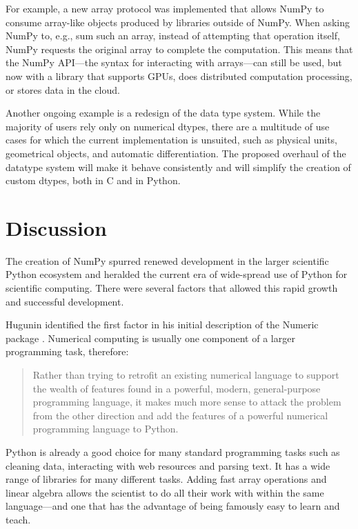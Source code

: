 For example, a new array protocol was implemented that allows NumPy to consume
array-like objects produced by libraries outside of NumPy.  When asking NumPy
to, e.g., sum such an array, instead of attempting that operation itself, NumPy
requests the original array to complete the computation.  This means that the
NumPy API---the syntax for interacting with arrays---can still be used, but now
with a library that supports GPUs, does distributed computation processing, or
stores data in the cloud.

Another ongoing example is a redesign of the data type system.
While the majority of users rely only on numerical dtypes, there are a
multitude of use cases for which the current implementation is unsuited, such
as physical units\cite{astropy,Goldbaum2018,pint}, geometrical
objects\cite{pygeos}, and automatic differentiation\cite{pyadolc}.
The proposed overhaul of the datatype system will make it behave consistently
and will simplify the creation of custom dtypes, both in C and in Python.


\section*{Discussion}



The creation of NumPy spurred renewed development in the larger scientific
Python ecosystem and heralded the current era of wide-spread use of Python for
scientific computing.
There were several factors that allowed this rapid growth
and successful development.

Hugunin identified the first factor in his initial description of the Numeric
package \cite{Hugunin-whitepaper}.  Numerical computing is usually one
component of a larger programming task, therefore:
\begin{quote}
    Rather than trying to retrofit an existing numerical language to support
    the wealth of features found in a powerful, modern, general-purpose
    programming language, it makes much more sense to attack the problem from
    the other direction and add the features of a powerful numerical
    programming language to Python.
\end{quote}
Python is already a good choice for many standard programming tasks such as
cleaning data, interacting with web resources and parsing text.  It has a wide
range of libraries for many different tasks. Adding fast array operations and
linear algebra allows the scientist to do all their work with within the same
language---and one that has the advantage of being famously easy to learn and
teach.

